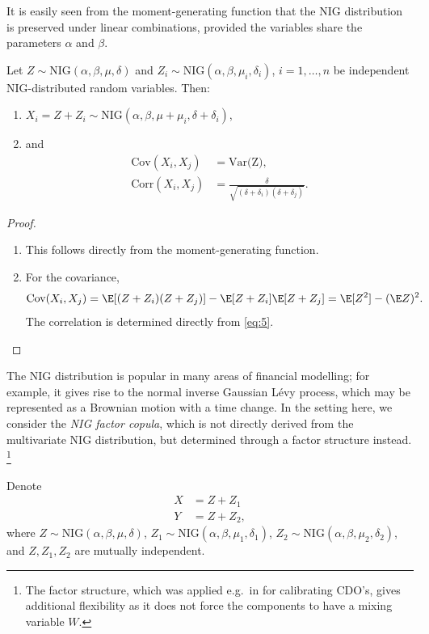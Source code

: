 It is easily seen from the moment-generating function that the NIG distribution is preserved under linear combinations, provided
the variables share the parameters $\alpha$ and $\beta$. 
\begin{proposition}
  \label{prop:NIG}
  Let $Z\sim \text{NIG}(\alpha, \beta, \mu, \delta)$ and
  $Z_i\sim \text{NIG}(\alpha, \beta, \mu_i, \delta_i)$,
  $i=1,\ldots, n$ be independent NIG-distributed random
  variables. Then:
  \begin{enumerate}
  \item  $X_i = Z + Z_i\sim \text{NIG}(\alpha,\beta,\mu+\mu_i,
  \delta+\delta_i)$,
\item and 
  \begin{align}
    \text{Cov}(X_i,X_j) &= \text{Var(Z)},\nonumber\\
    \text{Corr}(X_i,X_j) &= \frac{\delta}{\sqrt{(\delta+\delta_i)
                           (\delta+\delta_j)}}. \label{eq:6}
  \end{align}
\end{enumerate}
\end{proposition}
\begin{proof}
  \begin{enumerate}
  \item This follows directly from the moment-generating function. 
  \item For the covariance,
    \begin{equation*}
      \text{Cov}(X_i,X_j)
      = \E[(Z+Z_i) (Z+Z_j)] - \E[Z+Z_i] \E[Z+Z_j]
      = \E[Z^2] -(\E Z)^2.
    \end{equation*}
    The correlation is determined directly from \ref{eq:5}.
  \end{enumerate}
\end{proof}

The NIG distribution is popular in many areas of
financial modelling; for example, it gives rise 
to the normal inverse Gaussian L\'evy process, which may be represented
as a Brownian motion with a time change.
In the setting here, we consider the {\em NIG factor copula}, which is
not directly derived from the multivariate NIG distribution, but
determined through a factor structure instead. \footnote{The factor structure,
which was applied e.g.\ in \citep{Kalemanova2007} for calibrating CDO's,
gives additional flexibility as it does not force the components to
have a mixing variable $W$.}

Denote 
\begin{align*}
  X &= Z + Z_1 \\ 
  Y &= Z + Z_2,
  \end{align*}
where $Z \sim \text{NIG}(\alpha, \beta, \mu, \delta)$, $Z_1 \sim \text{NIG}(\alpha, \beta, \mu_1, \delta_1)$, 
$Z_2 \sim \text{NIG}(\alpha, \beta, \mu_2, \delta_2)$, and $Z, Z_1, Z_2$ are mutually independent. 

